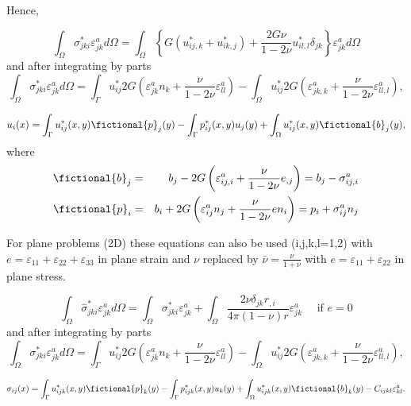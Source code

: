 Hence,

\begin{equation}\nonumber
\int_{\Omega}\sigma^{*}_{jki} \varepsilon^a_{jk} d \Omega=\int_{\Omega}\left\{G\left(u^{*}_{ij,k}+u^{*}_{ik,j}\right)+\frac{2G\nu}{1-2\nu}u^{*}_{il,l}\delta_{jk}\right\} \varepsilon^a_{jk} d \Omega
\end{equation}
and after integrating by parts 
\begin{equation}\nonumber
\int_{\Omega}\sigma^{*}_{jki} \varepsilon^a_{jk} d \Omega=\int_{\Gamma}u^{*}_{ij}2G\left( \varepsilon^a_{jk}n_k+\frac{\nu}{1-2\nu} \varepsilon^a_{ll}\right)-\int_{\Omega}u^{*}_{ij}2G\left(\varepsilon^a_{jk,k}+\frac{\nu}{1-2\nu} \varepsilon^a_{ll,l}\right),
\end{equation}

\begin{equation}
u_i(x)=\int_{\Gamma}u^{*}_{ij}(x,y) \fictional{p}_j(y)-\int_{\Gamma}p^{*}_{ij}(x,y) u_j(y)+\int_{\Omega}u^{*}_{ij}(x,y)\fictional{b}_{j}(y),
\end{equation}
where
\begin{eqnarray}
\fictional{b}_j&=& b_j-2G\left( \varepsilon_{ij,i}^a+\frac{\nu}{1-2\nu}e_{,j}\right)= b_j- \sigma_{ij,i}^a \nonumber \\
\fictional{p}_i&=&b_i+2G\left(\varepsilon_{ij}^a n_j+\frac{\nu}{1-2\nu}e n_i\right)= \nonumber  p_i+\sigma_{ij}^a n_j
\end{eqnarray}


For plane problems (2D) these equations can also be used (i,j,k,l=1,2) with $e=\varepsilon_{11}+\varepsilon_{22}+\varepsilon_{33}$ in plane strain and $\nu$ replaced by $\bar{\nu}=\frac{\nu}{1+\nu}$ with $e=\varepsilon_{11}+\varepsilon_{22}$ in plane stress.

\begin{equation}\nonumber
\int_{\Omega}\hat{\sigma}^{*}_{jki} \varepsilon^a_{jk} d \Omega=\int_{\Omega}\sigma^{*}_{jki} \varepsilon^a_{jk}+\int_{\Omega}\frac{2\nu \delta_{jk}r_{,i}}{4\pi (1-\nu)r} \varepsilon^a_{jk} \quad \mbox{ if } e=0
\end{equation}
and after integrating by parts 
\begin{equation}\nonumber
\int_{\Omega}\sigma^{*}_{jki} \varepsilon^a_{jk} d \Omega=\int_{\Gamma}u^{*}_{ij}2G\left( \varepsilon^a_{jk}n_k+\frac{\nu}{1-2\nu} \varepsilon^a_{ll}\right)-\int_{\Omega}u^{*}_{ij}2G\left(\varepsilon^a_{jk,k}+\frac{\nu}{1-2\nu} \varepsilon^a_{ll,l}\right),
\end{equation}

\begin{eqnarray}
\sigma_{ij}(x)=\int_{\Gamma}u^{*}_{ijk}(x,y) \fictional{p}_k(y)-\int_{\Gamma}p^{*}_{ijk}(x,y) u_k(y)+\int_{\Omega}u^{*}_{ijk}(x,y)\fictional{b}_{k}(y)-C_{ijkl}\varepsilon^{a}_{kl}.\nonumber
\end{eqnarray}

